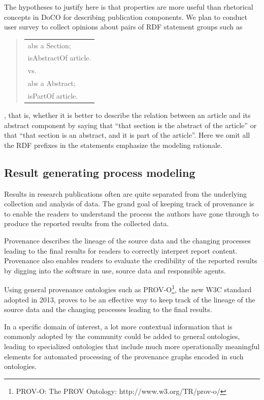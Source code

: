 The hypotheses to justify here is that properties are more useful than rhetorical concepts in DoCO for describing publication components. We plan to conduct user survey to collect opinions about pairs of RDF statement groups such as

\begin{quote}
	\begin{tabular}{l}
	abs a Section;\\
	 \hspace{1em}isAbstractOf article.\\
	 \hspace{3em}vs.\\
	abs a Abstract;\\ 
	 \hspace{1em}isPartOf article.
	\end{tabular}
\end{quote}

, that is, whether it is better to describe the relation between an article and its abstract component by saying that ``that section is the abstract of the article'' or that ``that section is an abstract, and it is part of the article''. Here we omit all the RDF prefixes in the statements emphasize the modeling rationale.

\subsection{Result generating process modeling}
\label{subsec:process}
Results in research publications often are quite separated from the underlying collection and analysis of data. The grand goal of keeping track of provenance is to enable the readers to understand the process the authors have gone through to produce the reported results from the collected data.

Provenance describes the lineage of the source data and the changing processes leading to the final results for readers to correctly interpret report content. Provenance also enables readers to evaluate the credibility of the reported results by digging into the software in use, source data and responsible agents.

Using general provenance ontologies such as PROV-O\footnote{PROV-O: The PROV Ontology: http://www.w3.org/TR/prov-o/}, the new W3C standard adopted in 2013, proves to be an effective way to keep track of the lineage of the source data and the changing processes leading to the final results.

In a specific domain of interest, a lot more contextual information that is commonly adopted by the community could be added to general ontologies, leading to specialized ontologies that include much more operationally meaningful elements for automated processing of the provenance graphs encoded in such ontologies.

